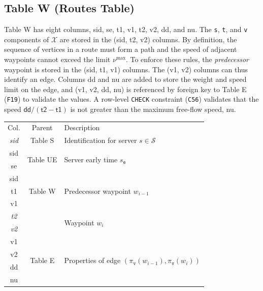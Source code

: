 \subsection{Table W (Routes Table)}
Table W has eight columns, \textsf{sid}, \textsf{se}, \textsf{t1}, \textsf{v1},
\textsf{t2}, \textsf{v2}, \textsf{dd}, and \textsf{nu}.  The \texttt{s},
\texttt{t}, and \texttt{v} components of $\mathcal{X}$ are stored in the
(\textsf{sid}, \textsf{t2}, \textsf{v2}) columns.  By definition, the sequence
of vertices in a route must form a path and the speed of adjacent waypoints
cannot exceed the limit $\nu^\textrm{max}$.  To enforce these rules, the
\emph{predecessor} waypoint is stored in the (\textsf{sid}, \textsf{t1},
\textsf{v1}) columns.  The (\textsf{v1}, \textsf{v2}) columns can thus identify
an edge. Columns \textsf{dd} and \textsf{nu} are added to store the weight and
speed limit on the edge, and (\textsf{v1}, \textsf{v2}, \textsf{dd},
\textsf{nu}) is referenced by foreign key to Table E ({\tt{}F19}) to validate the
values. A row-level \texttt{CHECK} constraint ({\tt{}C56}) validates that the
speed $\textsf{dd}/(\textsf{t2}-\textsf{t1})$ is not greater than the maximum
free-flow speed, \textsf{nu}.
\begin{table}[h]
\centering
\small
\begin{tabular}{|c|c|l|}
\hline
\rowcolor{TableTitle}
\multicolumn{3}{|c|}{Table W (Routes)} \\
\hline
\rowcolor{TableHeader}
Col. & Parent & Description \\
\hline
\textit{sid} & Table S & Identification for server $s\in\mathcal{S}$ \\
\hline
sid & \multirow{2}{*}{Table UE} & \multirow{2}{*}{Server early time $s_\texttt{e}$} \\
se & & \\
\hline
sid & \multirow{3}{*}{Table W} & \multirow{3}{*}{Predecessor waypoint $w_{i-1}$} \\
t1 & & \\
v1 & & \\
\hline
\textit{t2} & & \multirow{2}{*}{Waypoint $w_i$} \\
\textit{v2} & & \\
\hline
v1 & \multirow{4}{*}{Table E} & \multirow{4}{*}{Properties of edge $(\pi_\texttt{v}(w_{i-1}),\pi_\texttt{v}(w_i))$} \\
v2 & & \\
dd & & \\
nu & & \\
\hline
\end{tabular}
\end{table}
